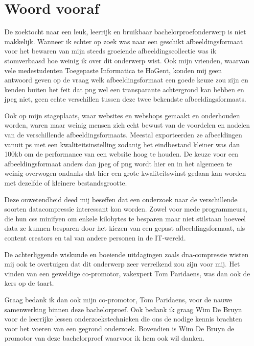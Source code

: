 
\chapter*{Woord vooraf}
\label{ch:voorwoord}

De zoektocht naar een leuk, leerrijk en bruikbaar bachelorproefonderwerp is niet makkelijk. Wanneer ik echter op zoek was naar een geschikt \gls{afbeeldingsformaat} voor het bewaren van mijn steeds groeiende afbeeldingscollectie was ik stomverbaasd hoe weinig ik over dit onderwerp wist. Ook mijn vrienden, waarvan vele medestudenten Toegepaste Informatica te HoGent, konden mij geen antwoord geven op de vraag welk \gls{afbeeldingsformaat} een goede keuze zou zijn en kenden buiten het feit dat \gls{png} wel een transparante achtergrond kan hebben en \gls{jpeg} niet, geen echte verschillen tussen deze twee bekendste \glspl{afbeeldingsformaat}.

Ook op mijn stageplaats, waar websites en webshops gemaakt en onderhouden worden, waren maar weinig mensen zich echt bewust van de voordelen en nadelen van de verschillende \glspl{afbeeldingsformaat}. Meestal exporteerden ze afbeeldingen vanuit \gls{ps} met een kwaliteitsinstelling zodanig het eindbestand kleiner was dan 100kb om de performance van een website hoog te houden. De keuze voor een \gls{afbeeldingsformaat} anders dan \gls{jpeg} of \gls{png} wordt hier en in het algemeen te weinig overwogen ondanks dat hier een grote kwaliteitswinst gedaan kan worden met dezelfde of kleinere bestandsgrootte. 

Deze onwetendheid deed mij beseffen dat een onderzoek naar de verschillende soorten \gls{datacompressie} interessant kon worden. Zowel voor mede programmeurs, die hun \gls{css} \gls{minifyen} om enkele kilobytes te besparen maar niet stilstaan hoeveel data ze kunnen besparen door het kiezen van een gepast \gls{afbeeldingsformaat}, als content creators en tal van andere personen in de IT-wereld. 

De achterliggende wiskunde en boeiende uitdagingen zoals \gls{dna-compressie} wisten mij ook te overtuigen dat dit onderwerp zeer verreikend zou zijn voor mij. Het vinden van een geweldige co-promotor, vakexpert Tom Paridaens, was dan ook de kers op de taart.

\pagebreak

Graag bedank ik dan ook mijn co-promotor, Tom Paridaens, voor de nauwe samenwerking binnen deze bachelorproef. Ook bedank ik graag Wim De Bruyn voor de leerrijke lessen onderzoekstechnieken die ons de nodige kennis brachten voor het voeren van een gegrond onderzoek. Bovendien is Wim De Bruyn de promotor van deze bachelorproef waarvoor ik hem ook wil danken.

